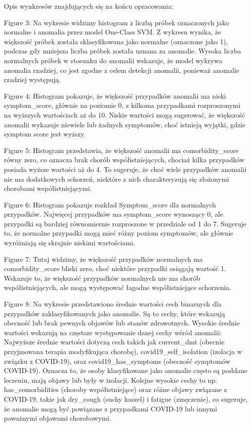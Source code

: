 \documentclass[a4paper,fleqn]{cas-dc}
\begin{document}
Opis wynkresów znajdujących się na końcu opracowania:

Figure 3: Na wykresie widzimy histogram z liczbą próbek oznaczonych jako normalne i anomalia przez model One-Class SVM.
Z wykresu wynika, że większość próbek została sklasyfikowana jako normalne (oznaczone jako 1), podczas gdy mniejsza liczba próbek została uznana za anomalie.
Wysoka liczba normalnych próbek w stosunku do anomalii wskazuje, że model wykrywa anomalia rzadziej, co jest zgodne z celem detekcji anomalii, ponieważ anomalie rzadziej występują.


Figure 4: Histogram pokazuje, że większość przypadków anomalii ma niski symptom\_score, głównie na poziomie 0, z kilkoma przypadkami rozproszonymi na wyższych wartościach aż do 10. Niskie wartości mogą sugerować, że większość anomalii wykazuje niewiele lub żadnych symptomów, choć istnieją wyjątki, gdzie symptom score jest wyższy.


Figure 5: Histogram przedstawia, że większość anomalii ma comorbidity\_score równy zero, co oznacza brak chorób współistniejących, chociaż kilka przypadków posiada wyższe wartości aż do 4. To sugeruje, że choć wiele przypadków anomalii nie ma dodatkowych schorzeń, niektóre z nich charakteryzują się złożonymi chorobami współistniejącymi.


Figure 6: Histogram pokazuje rozkład Symptom\_score dla normalnych przypadków. Najwięcej przypadków ma symptom\_score wynoszący 0, ale przypadki są bardziej równomiernie rozproszone w przedziale od 1 do 7. Sugeruje to, że normalne przypadki mogą mieć różny poziom symptomów, ale głównie wyróżniają się skrajnie niskimi wartościami.


Figure 7: Tutaj widzimy, że większość przypadków normalnych ma comorbidity\_score bliski zero, choć niektóre przypadki osiągają wartość 1. Wskazuje to, że większość przypadków normalnych nie ma chorób współistniejących, ale mogą występować łagodne współistniejące schorzenia.

Figure 8: Na wykresie przedstawiono średnie wartości cech binarnych dla przypadków zaklasyfikowanych jako anomalie. Są to cechy, które wskazują obecność lub brak pewnych objawów lub stanów zdrowotnych. Wysokie średnie wartości wskazują na częstsze występowanie danej cechy wśród anomalii:
Najwyższe średnie wartości dotyczą cech takich jak current\_dmt (obecnie przyjmowana terapia modyfikująca chorobę), covid19\_self\_isolation (izolacja w związku z COVID-19), oraz covid19\_has\_symptoms (obecność symptomów COVID-19). Oznacza to, że osoby klasyfikowane jako anomalie często są poddane leczeniu, mają objawy lub były w izolacji.
Kolejne wysokie cechy to np. has\_comorbidities (choroby współistniejące) oraz różne objawy związane z COVID-19, takie jak dry\_cough (suchy kaszel) i fatigue (zmęczenie), co sugeruje, że anomalie mogą być powiązane z przypadkami COVID-19 lub innymi poważnymi objawami chorobowymi.
\end{document}
